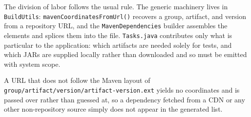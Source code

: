 The division of labor follows the usual rule.  The generic machinery lives in \texttt{BuildUtils}: \texttt{mavenCoordinatesFromUrl()} recovers a group, artifact, and version from a repository URL, and the \texttt{MavenDependencies} builder assembles the elements and splices them into the file.  \texttt{Tasks.java} contributes only what is particular to the application: which artifacts are needed solely for tests, and which JARs are supplied locally rather than downloaded and so must be emitted with system scope.

\begin{notebox}
A URL that does not follow the Maven layout of \texttt{group/artifact/version/artifact-version.ext} yields no coordinates and is passed over rather than guessed at, so a dependency fetched from a CDN or any other non-repository source simply does not appear in the generated list.
\end{notebox}
